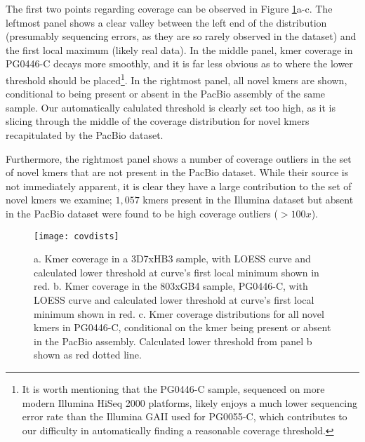 The first two points regarding coverage can be observed in Figure \ref{fig:covdists}a-c.  The leftmost panel shows a clear valley between the left end of the distribution (presumably sequencing errors, as they are so rarely observed in the dataset) and the first local maximum (likely real data).  In the middle panel, kmer coverage in PG0446-C decays more smoothly, and it is far less obvious as to where the lower threshold should be placed\footnote{It is worth mentioning that the PG0446-C sample, sequenced on more modern Illumina HiSeq 2000 platforms, likely enjoys a much lower sequencing error rate than the Illumina GAII used for PG0055-C, which contributes to our difficulty in automatically finding a reasonable coverage threshold.}.  In the rightmost panel, all novel kmers are shown, conditional to being present or absent in the PacBio assembly of the same sample.  Our automatically calulated threshold is clearly set too high, as it is slicing through the middle of the coverage distribution for novel kmers recapitulated by the PacBio dataset.

Furthermore, the rightmost panel shows a number of coverage outliers in the set of novel kmers that are not present in the PacBio dataset.  While their source is not immediately apparent, it is clear they have a large contribution to the set of novel kmers we examine; $1,057$ kmers present in the Illumina dataset but absent in the PacBio dataset were found to be high coverage outliers ($> 100x$).

\begin{figure}[h!]
  \centering
    \texttt{[image: covdists]}
  \caption{a. Kmer coverage in a 3D7xHB3 sample, with LOESS curve and calculated lower threshold at curve's first local minimum shown in red.  b. Kmer coverage in the 803xGB4 sample, PG0446-C, with LOESS curve and calculated lower threshold at curve's first local minimum shown in red.  c. Kmer coverage distributions for all novel kmers in PG0446-C, conditional on the kmer being present or absent in the PacBio assembly.  Calculated lower threshold from panel b shown as red dotted line.}
  \label{fig:covdists}
\end{figure}

